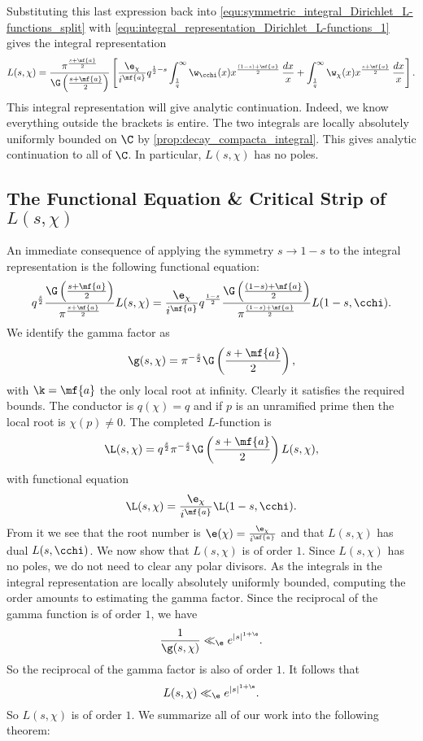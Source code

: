       Substituting this last expression back into \cref{equ:symmetric_integral_Dirichlet_L-functions_split} with \cref{equ:integral_representation_Dirichlet_L-functions_1} gives the integral representation
      \[
        L(s,\chi) = \frac{\pi^{\frac{s+\mf{a}}{2}}}{\G\left(\frac{s+\mf{a}}{2}\right)}\left[\frac{\e_{\chi}}{i^{\mf{a}}}q^{\frac{1}{2}-s}\int_{\frac{1}{q}}^{\infty}\w_{\cchi}(x)x^{\frac{(1-s)+\mf{a}}{2}}\,\frac{dx}{x}+\int_{\frac{1}{q}}^{\infty}\w_{\chi}(x)x^{\frac{s+\mf{a}}{2}}\,\frac{dx}{x}\right].
      \]
      This integral representation will give analytic continuation. Indeed, we know everything outside the brackets is entire. The two integrals are locally absolutely uniformly bounded on $\C$ by \cref{prop:decay_compacta_integral}. This gives analytic continuation to all of $\C$. In particular, $L(s,\chi)$ has no poles.
    \subsection*{The Functional Equation \& Critical Strip of \texorpdfstring{$L(s,\chi)$}{L(s,\chi)}}
      An immediate consequence of applying the symmetry $s \to 1-s$ to the integral representation is the following functional equation:
      \[
        q^{\frac{s}{2}}\frac{\G\left(\frac{s+\mf{a}}{2}\right)}{\pi^{\frac{s+\mf{a}}{2}}}L(s,\chi) = \frac{\e_{\chi}}{i^{\mf{a}}}q^{\frac{1-s}{2}}\frac{\G\left(\frac{(1-s)+\mf{a}}{2}\right)}{\pi^{\frac{(1-s)+\mf{a}}{2}}}L(1-s,\cchi).
      \]
      We identify the gamma factor as
      \[
        \g(s,\chi) = \pi^{-\frac{s}{2}}\G\left(\frac{s+\mf{a}}{2}\right),
      \]
      with $\k = \mf{a}$ the only local root at infinity. Clearly it satisfies the required bounds. The conductor is $q(\chi) = q$ and if $p$ is an unramified prime then the local root is $\chi(p) \neq 0$. The completed $L$-function is
      \[
        \L(s,\chi) = q^{\frac{s}{2}}\pi^{-\frac{s}{2}}\G\left(\frac{s+\mf{a}}{2}\right)L(s,\chi),
      \]
      with functional equation
      \[
        \L(s,\chi) = \frac{\e_{\chi}}{i^{\mf{a}}}\L(1-s,\cchi).
      \]
      From it we see that the root number is $\e(\chi) = \frac{\e_{\chi}}{i^{\mf{a}}}$ and that $L(s,\chi)$ has dual $L(s,\cchi)$. We now show that $L(s,\chi)$ is of order $1$. Since $L(s,\chi)$ has no poles, we do not need to clear any polar divisors. As the integrals in the integral representation are locally absolutely uniformly bounded, computing the order amounts to estimating the gamma factor. Since the reciprocal of the gamma function is of order $1$, we have
      \[
        \frac{1}{\g(s,\chi)} \ll_{\e} e^{|s|^{1+\e}}.
      \]
      So the reciprocal of the gamma factor is also of order $1$. It follows that
      \[
        L(s,\chi) \ll_{\e} e^{|s|^{1+\e}}.
      \]
      So $L(s,\chi)$ is of order $1$. We summarize all of our work into the following theorem:


